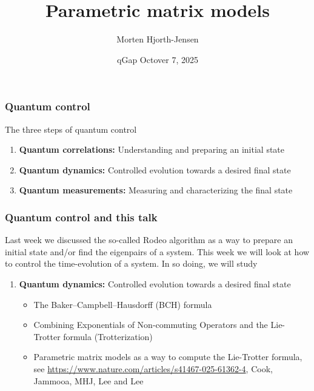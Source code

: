 \documentclass{beamer}
\begin{document}
\begin{frame}
\title[Quantum Computing and ML]{\textbf{Parametric matrix models}}
\author{Morten Hjorth-Jensen}
\date{qGap Octover 7, 2025}
\titlepage
\end{frame}



\begin{frame}
\frametitle{Quantum control}

\begin{block}{The three steps of quantum control}
\begin{enumerate}
\item {\bf Quantum correlations:} Understanding and preparing an initial state
\item {\bf Quantum dynamics:} Controlled evolution towards a desired final state
\item {\bf Quantum measurements:} Measuring and characterizing the final state
\end{enumerate}


\end{block}

\end{frame}

\begin{frame}
\frametitle{Quantum control and this talk}

Last week we discussed the so-called Rodeo algorithm as a way to
prepare an initial state and/or find the eigenpairs of a system. This
week we will look at how to control the time-evolution of a system. In
so doing, we will study
\begin{block}{}
\begin{enumerate}
\item {\bf Quantum dynamics:} Controlled evolution towards a desired final state
  \begin{itemize}
  \item The Baker–Campbell–Hausdorff (BCH) formula
  \item Combining Exponentials of Non-commuting Operators and the Lie-Trotter formula (Trotterization)
  \item Parametric matrix models as a way to compute the Lie-Trotter formula, see \url{https://www.nature.com/articles/s41467-025-61362-4}, Cook, Jammooa, MHJ, Lee and Lee
  \end{itemize}  
\end{enumerate}
\end{block}
\end{frame}
\end{document}
